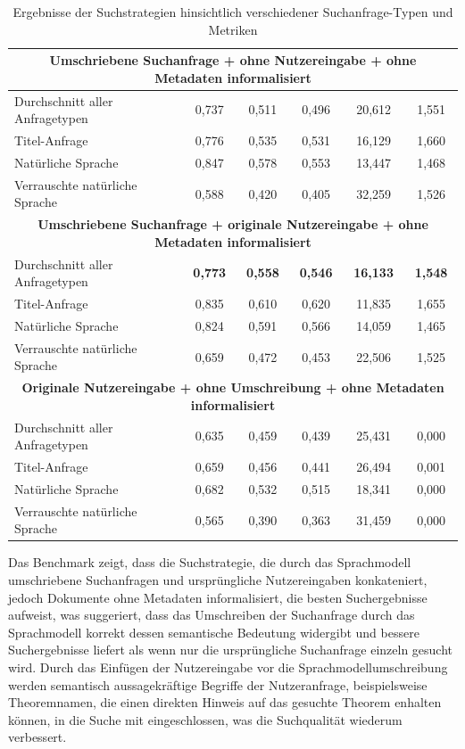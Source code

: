 \documentclass[12pt,letterpaper]{article} %
\begin{document}
\begin{table}[H]
\begin{tabular}{lccccc}
\midrule
\multicolumn{6}{c}{\textbf{Umschriebene Suchanfrage + ohne Nutzereingabe + ohne Metadaten informalisiert}} \\
\midrule

Durchschnitt aller Anfragetypen & 0,737 & 0,511 & 0,496 & 20,612 & 1,551 \\
Titel-Anfrage & 0,776 & 0,535 & 0,531 & 16,129 & 1,660 \\
Natürliche Sprache & 0,847 & 0,578 & 0,553 & 13,447 & 1,468 \\
Verrauschte natürliche Sprache & 0,588 & 0,420 & 0,405 & 32,259 & 1,526 \\

\midrule
\multicolumn{6}{c}{\textbf{Umschriebene Suchanfrage + originale Nutzereingabe + ohne Metadaten informalisiert}} \\
\midrule

Durchschnitt aller Anfragetypen & \textbf{0,773} & \textbf{0,558} & \textbf{0,546} & \textbf{16,133} & \textbf{1,548} \\
Titel-Anfrage & 0,835 & 0,610 & 0,620 & 11,835 & 1,655 \\
Natürliche Sprache & 0,824 & 0,591 & 0,566 & 14,059 & 1,465 \\
Verrauschte natürliche Sprache & 0,659 & 0,472 & 0,453 & 22,506 & 1,525 \\

\midrule
\multicolumn{6}{c}{\textbf{Originale Nutzereingabe + ohne Umschreibung + ohne Metadaten informalisiert}} \\
\midrule

Durchschnitt aller Anfragetypen & 0,635 & 0,459 & 0,439 & 25,431 & 0,000 \\
Titel-Anfrage & 0,659 & 0,456 & 0,441 & 26,494 & 0,001 \\
Natürliche Sprache & 0,682 & 0,532 & 0,515 & 18,341 & 0,000 \\
Verrauschte natürliche Sprache & 0,565 & 0,390 & 0,363 & 31,459 & 0,000 \\

\bottomrule
\end{tabular}
\caption{Ergebnisse der Suchstrategien hinsichtlich verschiedener Suchanfrage-Typen und Metriken}
\label{tab:suchstrategien_tabelle}
\end{table}

Das Benchmark zeigt, dass die Suchstrategie, die durch das Sprachmodell umschriebene Suchanfragen und ursprüngliche Nutzereingaben konkateniert, jedoch Dokumente ohne Metadaten informalisiert, die besten Suchergebnisse aufweist, was suggeriert, dass das Umschreiben der Suchanfrage durch das Sprachmodell korrekt dessen semantische Bedeutung widergibt und bessere Suchergebnisse liefert als wenn nur die ursprüngliche Suchanfrage einzeln gesucht wird.
Durch das Einfügen der Nutzereingabe vor die Sprachmodellumschreibung werden semantisch aussagekräftige Begriffe der Nutzeranfrage, beispielsweise Theoremnamen, die einen direkten Hinweis auf das gesuchte Theorem enhalten können, in die Suche mit eingeschlossen, was die Suchqualität wiederum verbessert.
\end{document}
